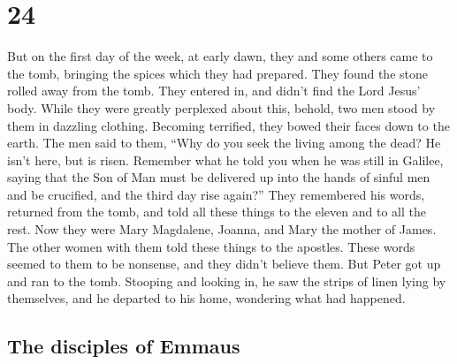 \hypertarget{section-14}{%
\section{24}\label{section-14}}

 But on the first day of the week, at early dawn, they and
some others came to the tomb, bringing the spices which they had
prepared.  They found the stone rolled away from the tomb.
 They entered in, and didn't find the Lord Jesus' body.
 While they were greatly perplexed about this, behold, two
men stood by them in dazzling clothing.  Becoming
terrified, they bowed their faces down to the earth. The men said to
them, ``Why do you seek the living among the dead?  He
isn't here, but is risen. Remember what he told you when he was still in
Galilee,  saying that the Son of Man must be delivered up
into the hands of sinful men and be crucified, and the third day rise
again?''  They remembered his words, 
returned from the tomb, and told all these things to the eleven and to
all the rest.  Now they were Mary Magdalene, Joanna, and
Mary the mother of James. The other women with them told these things to
the apostles.  These words seemed to them to be nonsense,
and they didn't believe them.  But Peter got up and ran
to the tomb. Stooping and looking in, he saw the strips of linen lying
by themselves, and he departed to his home, wondering what had happened.

\hypertarget{the-disciples-of-emmaus}{%
\subsection{The disciples of Emmaus}\label{the-disciples-of-emmaus}}

